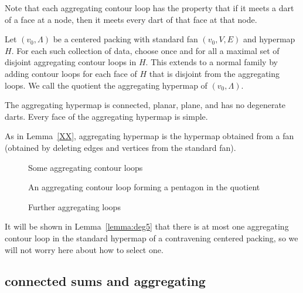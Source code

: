 Note that each aggregating contour loop has the property that
if it meets a dart of a face at a node, then it meets every dart
of that face at that node.

\begin{definition}  Let $(v_0,\Lambda)$ be a centered packing with
standard fan $(v_0,V,E)$ and hypermap $H$.  For
each such collection of data, choose once and for all
a maximal set of disjoint aggregating
contour loops in $H$.  This extends to a normal family by adding
contour loops for each face of $H$ that is disjoint from the aggregating
loops.    We call the quotient the aggregating hypermap of $(v_0,\Lambda)$.
\end{definition}

\begin{lemma} The aggregating hypermap is connected, planar, plane,
and has no degenerate darts.   Every face of the aggregating hypermap
is simple. 
\end{lemma}

As in Lemma~\ref{XX}, aggregating hypermap is the hypermap
obtained from a fan (obtained by deleting edges and
vertices from the standard fan).

\begin{figure}[htb]
  \centering
  \caption{Some aggregating contour loops} %
  \label{fig:agg}
\end{figure}

\begin{figure}[htb]
  \centering
  \caption{An aggregating contour loop forming a pentagon in the quotient}
  \label{fig:tri-pent}
\end{figure}

\begin{figure}[htb]
  \centering
  \caption{Further aggregating loops}
  \label{fig:degree6}
\end{figure}



It will be shown in
Lemma~\ref{lemma:deg5} that there is at most one aggregating
contour loop in the standard hypermap of a contravening centered packing,
so we will not worry here about how to select one.




\subsection{connected sums and aggregating}

